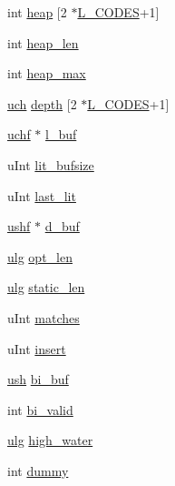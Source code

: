 \begin{DoxyCompactItemize}
\item 
int \hyperlink{structinternal__state_ad7edb9b1d387e631bc6fde1cad0af758}{heap} \mbox{[}2 $\ast$\hyperlink{deflate_8h_a2b0cc00cc6a7d521fba8d208a1cae477}{L\+\_\+\+C\+O\+D\+E\+S}+1\mbox{]}
\item 
int \hyperlink{structinternal__state_a0659e23b0188ac16db58f98ae2b67b6b}{heap\+\_\+len}
\item 
int \hyperlink{structinternal__state_aa8c78bbfa5d71f3ccc55445a62897f47}{heap\+\_\+max}
\item 
\hyperlink{zutil_8h_af3307af5922c72924a837559c801a8a4}{uch} \hyperlink{structinternal__state_a8e525b4f3dfa38b3bbcb8b427e333570}{depth} \mbox{[}2 $\ast$\hyperlink{deflate_8h_a2b0cc00cc6a7d521fba8d208a1cae477}{L\+\_\+\+C\+O\+D\+E\+S}+1\mbox{]}
\item 
\hyperlink{zutil_8h_aaa6fdf02a2fdaf3731f17a19920ddb0b}{uchf} $\ast$ \hyperlink{structinternal__state_a5e6c4269e29696b192e02fd01381e400}{l\+\_\+buf}
\item 
u\+Int \hyperlink{structinternal__state_a25ad7fc0094e412144b4201df2126bbb}{lit\+\_\+bufsize}
\item 
u\+Int \hyperlink{structinternal__state_a01689001a8f8c7dfa46a439b7ae0708a}{last\+\_\+lit}
\item 
\hyperlink{zutil_8h_ab854e4722acf30ada8a7a71b58d1b238}{ushf} $\ast$ \hyperlink{structinternal__state_ac636c34c1c08dc9d2f9c199ce2caa99d}{d\+\_\+buf}
\item 
\hyperlink{zutil_8h_abd6f60bf9450af2ecb94097a32c19a64}{ulg} \hyperlink{structinternal__state_a2f6efee5d2057aba8bca2c1a58cf418a}{opt\+\_\+len}
\item 
\hyperlink{zutil_8h_abd6f60bf9450af2ecb94097a32c19a64}{ulg} \hyperlink{structinternal__state_a8a83e269866761afa3a7b4641ba5ff91}{static\+\_\+len}
\item 
u\+Int \hyperlink{structinternal__state_ac0f10ec7237615f6b632f2f4d14872ef}{matches}
\item 
u\+Int \hyperlink{structinternal__state_a315b7281f725e5729fbbafada48fc70a}{insert}
\item 
\hyperlink{zutil_8h_a3754180d606d4ed15468d15d9665aa2e}{ush} \hyperlink{structinternal__state_a6880946d081053778f5f544b04603d13}{bi\+\_\+buf}
\item 
int \hyperlink{structinternal__state_a241f3606e41a3aa0ef22868a41bd9a0f}{bi\+\_\+valid}
\item 
\hyperlink{zutil_8h_abd6f60bf9450af2ecb94097a32c19a64}{ulg} \hyperlink{structinternal__state_a85439cd585435b2590039339139d25cb}{high\+\_\+water}
\item 
int \hyperlink{structinternal__state_ab000a3e3c901dd063859521988ad7e52}{dummy}
\end{DoxyCompactItemize}


